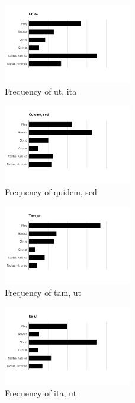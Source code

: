 \documentclass[11pt,twocolumn]{article}
\begin{document}
\begin{figure}
\includegraphics[width=0.5\textwidth]{utita.png}
\caption{\label{fig:ui}Frequency of ut, ita}
\end{figure}

\begin{figure}
\includegraphics[width=0.5\textwidth]{quidemsed.png}
\caption{\label{fig:qs}Frequency of quidem, sed}
\end{figure}

\begin{figure}
\includegraphics[width=0.5\textwidth]{tamut.png}
\caption{\label{fig:tu}Frequency of tam, ut}
\end{figure}

\begin{figure}
\includegraphics[width=0.5\textwidth]{itaut.png}
\caption{\label{fig:iu}Frequency of ita, ut}
\end{figure}
\end{document}

